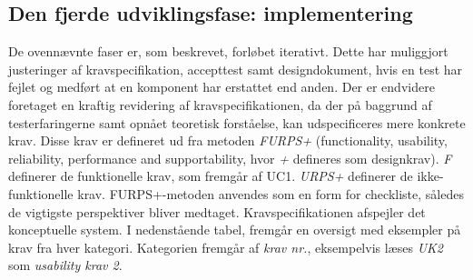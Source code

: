 \subsection{Den fjerde udviklingsfase: implementering}
De ovennævnte faser er, som beskrevet, forløbet iterativt. Dette har muliggjort justeringer af kravspecifikation, accepttest samt designdokument, hvis en test har fejlet og medført at en komponent har erstattet end anden. Der er endvidere foretaget en kraftig revidering af kravspecifikationen, da der på baggrund af testerfaringerne samt opnået teoretisk forståelse, kan udspecificeres mere konkrete krav. Disse krav er defineret ud fra metoden \textit{FURPS+} (functionality, usability, reliability, performance and supportability, hvor \textit{+} defineres som designkrav). \textit{F} definerer de funktionelle krav, som fremgår af UC1. \textit{URPS+} definerer de ikke-funktionelle krav. FURPS+-metoden anvendes som en form for checkliste, således de vigtigste perspektiver bliver medtaget. Kravspecifikationen afspejler det konceptuelle system. 
I nedenstående tabel, fremgår en oversigt med eksempler på krav fra hver kategori. Kategorien fremgår af \textit{krav nr.}, eksempelvis læses \textit{UK2} som \textit{usability krav 2}.  

